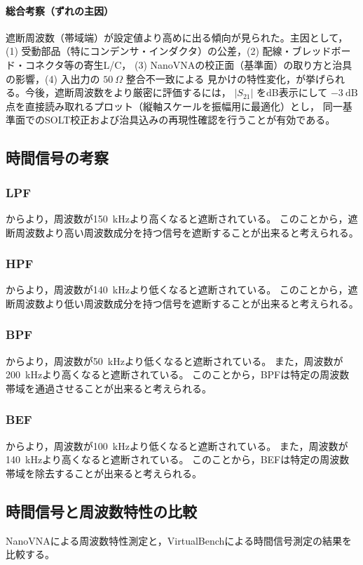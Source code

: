 \documentclass[11pt,dvipdfmx]{jarticle}
\begin{document}
\paragraph{総合考察（ずれの主因）}
遮断周波数（帯域端）が設定値より高めに出る傾向が見られた。主因として，
(1) 受動部品（特にコンデンサ・インダクタ）の公差，(2) 配線・ブレッドボード・コネクタ等の寄生L/C，
(3) NanoVNAの校正面（基準面）の取り方と治具の影響，(4) 入出力の $50\ \Omega$ 整合不一致による
見かけの特性変化，が挙げられる。今後，遮断周波数をより厳密に評価するには，
$|S_{21}|$ をdB表示にして $-3\ \mathrm{dB}$ 点を直接読み取れるプロット（縦軸スケールを振幅用に最適化）とし，
同一基準面でのSOLT校正および治具込みの再現性確認を行うことが有効である。
\subsection{時間信号の考察}
\subsubsection{LPF}
からより，周波数が150\ kHzより高くなると遮断されている。
このことから，遮断周波数より高い周波数成分を持つ信号を遮断することが出来ると考えられる。
\subsubsection{HPF}
からより，周波数が140\ kHzより低くなると遮断されている。
このことから，遮断周波数より低い周波数成分を持つ信号を遮断することが出来ると考えられる。
\subsubsection{BPF}
からより，周波数が50\ kHzより低くなると遮断されている。
また，周波数が200\ kHzより高くなると遮断されている。
このことから，BPFは特定の周波数帯域を通過させることが出来ると考えられる。
\subsubsection{BEF}
からより，周波数が100\ kHzより低くなると遮断されている。
また，周波数が140\ kHzより高くなると遮断されている。
このことから，BEFは特定の周波数帯域を除去することが出来ると考えられる。

\subsection{時間信号と周波数特性の比較}
NanoVNAによる周波数特性測定と，VirtualBenchによる時間信号測定の結果を比較する。
\end{document}
